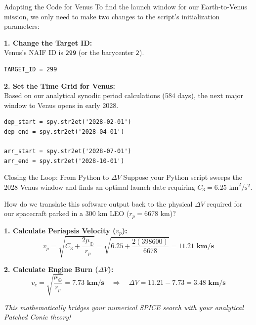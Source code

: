 \documentclass[11pt]{beamer}
\begin{document}
\begin{frame}[fragile]{Adapting the Code for Venus}
    To find the launch window for our Earth-to-Venus mission, we only need to make two changes to the script's initialization parameters:
    
    \vspace{0.3cm}
    \textbf{1. Change the Target ID:} \\
    Venus's NAIF ID is \texttt{299} (or the barycenter \texttt{2}).
\begin{lstlisting}
TARGET_ID = 299
\end{lstlisting}

    \vspace{0.3cm}
    \textbf{2. Set the Time Grid for Venus:} \\
    Based on our analytical synodic period calculations (584 days), the next major window to Venus opens in early 2028.
\begin{lstlisting}
dep_start = spy.str2et('2028-02-01')
dep_end = spy.str2et('2028-04-01')

arr_start = spy.str2et('2028-07-01')
arr_end = spy.str2et('2028-10-01')
\end{lstlisting}
\end{frame}

\begin{frame}{Closing the Loop: From Python to $\Delta V$}
    Suppose your Python script sweeps the 2028 Venus window and finds an optimal launch date requiring $C_3 = 6.25 \text{ km}^2/\text{s}^2$. 
    
    \vspace{0.2cm}
    How do we translate this software output back to the physical $\Delta V$ required for our spacecraft parked in a 300 km LEO ($r_p = 6678$ km)?
    
    \vspace{0.2cm}
    \textbf{1. Calculate Periapsis Velocity ($v_p$):}
    \begin{equation*}
        v_p = \sqrt{C_3 + \frac{2\mu_\oplus}{r_p}} = \sqrt{6.25 + \frac{2(398600)}{6678}} = \mathbf{11.21 \text{ km/s}}
    \end{equation*}
    
    \textbf{2. Calculate Engine Burn ($\Delta V$):}
    \begin{equation*}
        v_c = \sqrt{\frac{\mu_\oplus}{r_p}} = \mathbf{7.73 \text{ km/s}} \quad \Rightarrow \quad \Delta V = 11.21 - 7.73 = \mathbf{3.48 \text{ km/s}}
    \end{equation*}
    
    \textit{This mathematically bridges your numerical SPICE search with your analytical Patched Conic theory!}
\end{frame}
\end{document}
